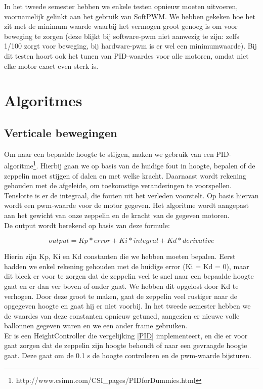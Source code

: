 \documentclass[eind]{penoverslag}
\begin{document}
In het tweede semester hebben we enkele testen opnieuw moeten uitvoeren, voornamelijk gelinkt aan het gebruik van SoftPWM. We hebben gekeken hoe het zit met de minimum waarde waarbij het vermogen groot genoeg is om voor beweging te zorgen (deze blijkt bij software-pwm niet aanwezig te zijn: zelfs 1/100 zorgt voor beweging, bij hardware-pwm is er wel een minimumwaarde). Bij dit testen hoort ook het tunen van PID-waardes voor alle motoren, omdat niet elke motor exact even sterk is. \\

\section{Algoritmes}
\subsection{Verticale bewegingen}
Om naar een bepaalde hoogte te stijgen, maken we gebruik van een PID-algoritme\footnote{http://www.csimn.com/CSI\_pages/PIDforDummies.html}. Hierbij gaan we op basis van de huidige fout in hoogte, bepalen of de zeppelin moet stijgen of dalen en met welke kracht. Daarnaast wordt rekening gehouden met de afgeleide, om toekomstige veranderingen te voorspellen. Tenslotte is er de integraal, die fouten uit het verleden voorstelt. Op basis hiervan wordt een pwm-waarde voor de motor gegeven. Het algoritme wordt aangepast aan het gewicht van onze zeppelin en de kracht van de gegeven motoren. \\
De output wordt berekend op basis van deze formule:

\begin{equation}
 output = Kp*error + Ki*integral + Kd*derivative
 \label{PID}
\end{equation}

Hierin zijn Kp, Ki en Kd constanten die we hebben moeten bepalen. Eerst hadden we enkel rekening gehouden met de huidige error (Ki = Kd = 0), maar dit bleek er voor te zorgen dat de zeppelin veel te snel naar een bepaalde hoogte gaat en er dan ver boven of onder gaat. We hebben dit opgelost door Kd te verhogen. Door deze groot te maken, gaat de zeppelin veel rustiger naar de opgegeven hoogte en gaat hij er niet voorbij. In het tweede semester hebben we de waardes van deze constanten opnieuw getuned, aangezien er nieuwe volle ballonnen gegeven waren en we een ander frame gebruiken. \\

Er is een HeightController die vergelijking \ref{PID} implementeert, en die er voor gaat zorgen dat de zeppelin zijn hoogte behoudt of naar een gevraagde hoogte gaat. Deze gaat om de 0.1 s de hoogte controleren en de pwm-waarde bijsturen. \\
\end{document}
